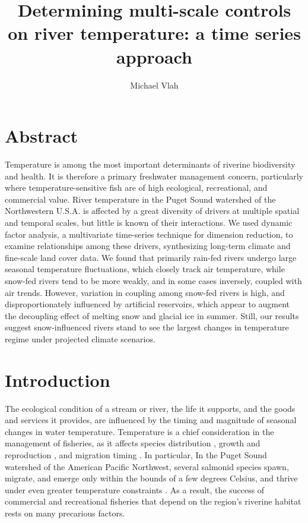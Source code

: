 \documentclass[notitlepage]{article}
\author{Michael Vlah}
\title{Determining multi-scale controls on river temperature: a time series approach}
\begin{document}

\maketitle
\clearpage


\section*{Abstract}
Temperature is among the most important determinants of riverine biodiversity and health. It is therefore a primary freshwater management concern, particularly where temperature-sensitive fish are of high ecological, recreational, and commercial value. River temperature in the Puget Sound watershed of the Northwestern U.S.A. is affected by a great diversity of drivers at multiple spatial and temporal scales, but little is known of their interactions. We used dynamic factor analysis, a multivariate time-series technique for dimension reduction, to examine relationships among these drivers, synthesizing long-term climate and fine-scale land cover data. We found that primarily rain-fed rivers undergo large seasonal temperature fluctuations, which closely track air temperature, while snow-fed rivers tend to be more weakly, and in some cases inversely, coupled with air trends. However, variation in coupling among snow-fed rivers is high, and disproportionately influenced by artificial reservoirs, which appear to augment the decoupling effect of melting snow and glacial ice in summer. Still, our results suggest snow-influenced rivers stand to see the largest changes in temperature regime under projected climate scenarios.

\clearpage

\section*{Introduction}

The ecological condition of a stream or river, the life it supports, and the goods and services it provides, are influenced by the timing and magnitude of seasonal changes in water temperature. Temperature is a chief consideration in the management of fisheries, as it affects species distribution \citep{Boisneau2008}, growth and reproduction \citep{mccullough1999review}, and migration timing \citep{boscarino2007effects}. In particular, In the Puget Sound watershed of the American Pacific Northwest, several salmonid species spawn, migrate, and emerge only within the bounds of a few degrees Celsius, and thrive under even greater temperature constraints \citep{carter2005effects}. As a result, the success of commercial and recreational fisheries that depend on the region's riverine habitat rests on many precarious factors.
\end{document}
